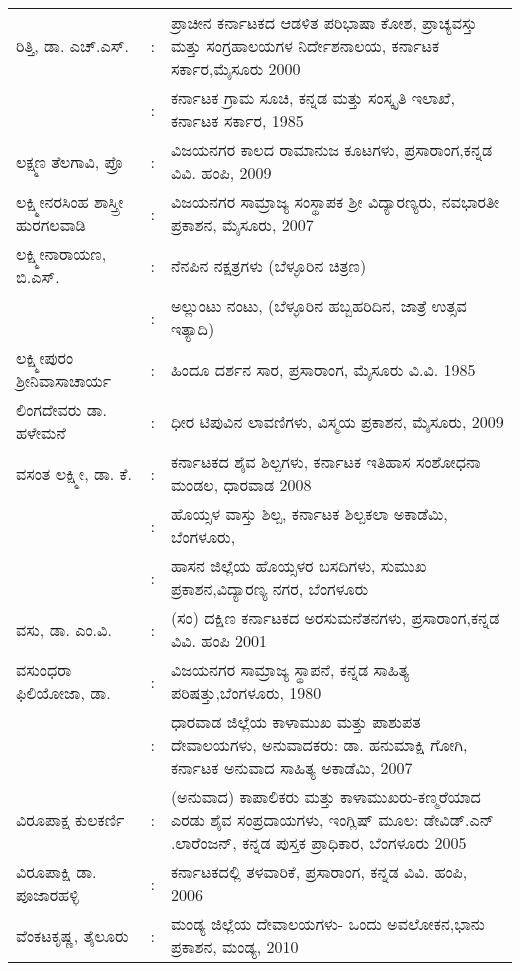 \begin{longtable}[l]{@{}>{\raggedright}p{4.7cm}cp{9.2cm}<{\raggedright}@{}}
ರಿತ್ತಿ, ಡಾ. ಎಚ್​.ಎಸ್​. & : &  ಪ್ರಾಚೀನ ಕರ್ನಾಟಕದ ಆಡಳಿತ ಪರಿಭಾಷಾ ಕೋಶ, ಪ್ರಾಚ್ಯವಸ್ತು ಮತ್ತು ಸಂಗ್ರಹಾಲಯಗಳ ನಿರ್ದೇಶನಾಲಯ, ಕರ್ನಾಟಕ ಸರ್ಕಾರ,\newline ಮೈಸೂರು 2000\\
& : & ಕರ್ನಾಟಕ ಗ್ರಾಮ ಸೂಚಿ, ಕನ್ನಡ ಮತ್ತು ಸಂಸ್ಕೃತಿ ಇಲಾಖೆ, ಕರ್ನಾಟಕ ಸರ್ಕಾರ, 1985\\
ಲಕ್ಷ್ಮಣ ತೆಲಗಾವಿ, ಪ್ರೊ & : &  ವಿಜಯನಗರ ಕಾಲದ ರಾಮಾನುಜ ಕೂಟಗಳು, ಪ್ರಸಾರಾಂಗ,\newline ಕನ್ನಡ ವಿವಿ. ಹಂಪಿ, 2009\\
ಲಕ್ಷ್ಮೀನರಸಿಂಹ ಶಾಸ್ತ್ರೀ ಹುರಗಲವಾಡಿ & : &  ವಿಜಯನಗರ ಸಾಮ್ರಾಜ್ಯ ಸಂಸ್ಥಾಪಕ ಶ‍್ರೀ ವಿದ್ಯಾರಣ್ಯರು, ನವಭಾರತೀ ಪ್ರಕಾಶನ, ಮೈಸೂರು, 2007\\
ಲಕ್ಷ್ಮೀನಾರಾಯಣ, ಬಿ.ಎಸ್​. & : & ನೆನಪಿನ ನಕ್ಷತ್ರಗಳು (ಬೆಳ್ಳೂರಿನ ಚಿತ್ರಣ)\\
& : & ಅಲ್ಲುಂಟು ನಂಟು, (ಬೆಳ್ಳೂರಿನ ಹಬ್ಬಹರಿದಿನ, ಜಾತ್ರೆ ಉತ್ಸವ ಇತ್ಯಾದಿ) \\
ಲಕ್ಷ್ಮೀಪುರಂ ಶ‍್ರೀನಿವಾಸಾಚಾರ್ಯ & : &  ಹಿಂದೂ ದರ್ಶನ ಸಾರ, ಪ್ರಸಾರಾಂಗ, ಮೈಸೂರು ವಿ.ವಿ. 1985\\
ಲಿಂಗದೇವರು ಡಾ. ಹಳೇಮನೆ & : & ಧೀರ ಟಿಪುವಿನ ಲಾವಣಿಗಳು, ವಿಸ್ಮಯ ಪ್ರಕಾಶನ, ಮೈಸೂರು, 2009\\
ವಸಂತ ಲಕ್ಷ್ಮೀ, ಡಾ. ಕೆ. & : & ಕರ್ನಾಟಕದ ಶೈವ ಶಿಲ್ಪಗಳು, ಕರ್ನಾಟಕ ಇತಿಹಾಸ ಸಂಶೋಧನಾ ಮಂಡಲ, ಧಾರವಾಡ 2008\\
& : & ಹೊಯ್ಸಳ ವಾಸ್ತು ಶಿಲ್ಪ, ಕರ್ನಾಟಕ ಶಿಲ್ಪಕಲಾ ಅಕಾಡೆಮಿ, ಬೆಂಗಳೂರು, \\
& : & ಹಾಸನ ಜಿಲ್ಲೆಯ ಹೊಯ್ಸಳರ ಬಸದಿಗಳು, ಸುಮುಖ ಪ್ರಕಾಶನ,\newline ವಿದ್ಯಾರಣ್ಯ ನಗರ, ಬೆಂಗಳೂರು\\
ವಸು, ಡಾ. ಎಂ.ವಿ. & : & (ಸಂ) ದಕ್ಷಿಣ ಕರ್ನಾಟಕದ ಅರಸುಮನೆತನಗಳು, ಪ್ರಸಾರಾಂಗ,\newline ಕನ್ನಡ ವಿವಿ. ಹಂಪಿ 2001\\
ವಸುಂಧರಾ ಫಿಲಿಯೋಜಾ, ಡಾ. & : & ವಿಜಯನಗರ ಸಾಮ್ರಾಜ್ಯ ಸ್ಥಾಪನೆ, ಕನ್ನಡ ಸಾಹಿತ್ಯ ಪರಿಷತ್ತು,\newline ಬೆಂಗಳೂರು, 1980\\
& : &  ಧಾರವಾಡ ಜಿಲ್ಲೆಯ ಕಾಳಾಮುಖ ಮತ್ತು ಪಾಶುಪತ ದೇವಾಲಯಗಳು, ಅನುವಾದಕರು: ಡಾ. ಹನುಮಾಕ್ಷಿ ಗೋಗಿ, ಕರ್ನಾಟಕ ಅನುವಾದ ಸಾಹಿತ್ಯ ಅಕಾಡೆಮಿ, 2007\\
ವಿರೂಪಾಕ್ಷ ಕುಲಕರ್ಣಿ & : & (ಅನುವಾದ) ಕಾಪಾಲಿಕರು ಮತ್ತು ಕಾಳಾಮುಖರು-ಕಣ್ಮರೆಯಾದ ಎರಡು ಶೈವ ಸಂಪ್ರದಾಯಗಳು, ಇಂಗ್ಲಿಷ್​ ಮೂಲ: ಡೇವಿಡ್​.ಎನ್​.ಲಾರೆಂಜನ್​, ಕನ್ನಡ ಪುಸ್ತಕ ಪ್ರಾಧಿಕಾರ, ಬೆಂಗಳೂರು 2005\\
ವಿರೂಪಾಕ್ಷಿ ಡಾ. ಪೂಜಾರಹಳ್ಳಿ & : &  ಕರ್ನಾಟಕದಲ್ಲಿ ತಳವಾರಿಕೆ, ಪ್ರಸಾರಾಂಗ, ಕನ್ನಡ ವಿವಿ. ಹಂಪಿ, 2006\\
ವೆಂಕಟಕೃಷ್ಣ, ತೈಲೂರು & : & ಮಂಡ್ಯ ಜಿಲ್ಲೆಯ ದೇವಾಲಯಗಳು- ಒಂದು ಅವಲೋಕನ,\newline ಭಾನು ಪ್ರಕಾಶನ, ಮಂಡ್ಯ, 2010\\

\end{longtable}
